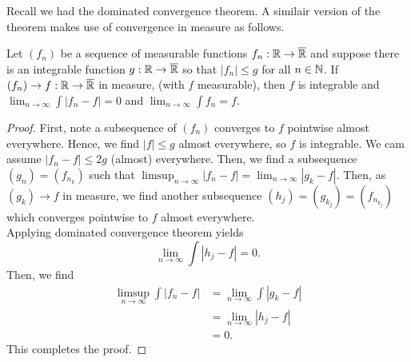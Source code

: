 Recall we had the dominated convergence theorem. A similair version of the theorem makes use of convergence in measure as follows.
\begin{theorem}
	Let \(\left( f_{n} \right) \) 	be a sequence of measurable functions \(f_{n}:\mathbb{R}  \to\overline{\mathbb{R}} \) and suppose there is an integrable function \(g: \mathbb{R} \to \overline{\mathbb{R}}\) so that \(\left| f_{n} \right|\le g \) for all \(n \in \mathbb{N}\). If \(\left( f_{n} \right)\to f: \mathbb{R} \to \overline{\mathbb{R}} \) in measure, (with \(f\) measurable), then \(f\) is integrable and \(\lim_{n \to \infty}\int \left| f_{n} - f \right|= 0 \) and \(\lim_{n \to \infty}\int f_{n} = f\).
\end{theorem}
\begin{proof}
	First, note a subsequence of \(\left( f_{n} \right) \) converges to \(f\) pointwise almost everywhere. Hence, we find \(\left| f \right|  \le g\) almost everywhere, so \(f\) is integrable. We cam assume \(\left| f_{n} - f \right|\le 2g \) (almost) everywhere. Then, we find a subsequence \(\left( g_{n} \right) = \left( f_{n_{k}} \right) \) such that \(\limsup_{n \to \infty} \left| f_{n} - f \right| = \lim_{n \to \infty}\left| g_{k} - f \right|  \). Then, as \(\left( g_{k} \right) \to f\) in measure, we find another subsequence \(\left( h_{j} \right) = \left( g_{k_{j}} \right)  = \left( f_{n_{k_{j}}} \right)  \) which converges pointwise to \(f\) almost everywhere.\\
	Applying dominated convergence theorem yields \[
	\lim_{n \to \infty} \int\left| h_{j} - f \right| = 0
	.\]
Then, we find
\begin{align*}
	\limsup_{n \to \infty} \int \left| f_{n} - f \right| &=  \lim_{n \to \infty} \int \left| g_{k} - f \right|  \\
	&= \lim_{n \to \infty} \left| h_{j} - f \right|  \\
	&= 0
.\end{align*}
This completes the proof.
\end{proof}

